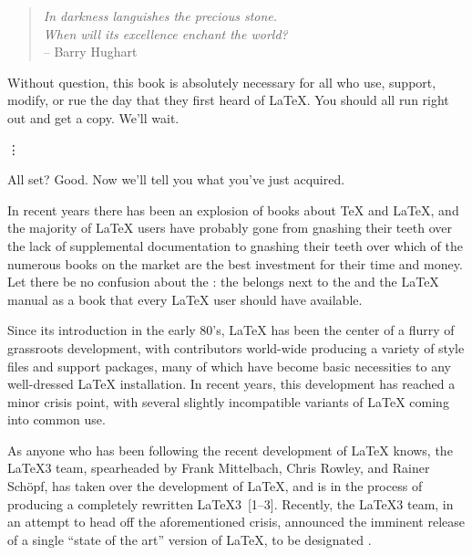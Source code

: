 \maketitle

\begin{verse}
{\em In darkness languishes the precious stone.\\
When will its excellence enchant the world?}\\
\hfill -- Barry Hughart
\end{verse}

\medskip

\reviewitem
{}
\endreviewitem

Without question, this book is absolutely necessary for all who use,
support, modify, or rue the day that they first heard of
\LaTeX.  You should all run right out and get a copy.  We'll wait.

\centerline{\vdots}

\noindent
All set?  Good.  Now we'll tell you what you've just acquired.

\bigskip

\noindent
In recent years there has been an explosion of books about \TeX{} and
\LaTeX, and the majority of \LaTeX{} users have probably gone from
gnashing their teeth over the lack of supplemental documentation to
gnashing their teeth over which of the numerous books on the market
are the best investment for their time and money.  Let there be no
confusion about the : the
 belongs next to the  and the
\LaTeX{} manual as a book that every \LaTeX{} user should have
available.

Since its introduction in the early 80's, \LaTeX{} has been the center
of a flurry of grassroots development, with contributors world-wide
producing a variety of style files and support packages, many of which
have become basic necessities to any well-dressed \LaTeX{}
installation.  In recent years, this development has reached a minor
crisis point, with several slightly incompatible variants of \LaTeX{}
coming into common use.

As anyone who has been following the recent development of \LaTeX{}
knows, the \LaTeX3 team, spearheaded by Frank Mittelbach, Chris
Rowley, and Rainer Sch\"opf, has taken over the development of \LaTeX,
and is in the process of producing a completely rewritten
\LaTeX3~[1--3].
Recently, the \LaTeX3 team, in an attempt to head off the
aforementioned crisis, announced the imminent release of a single
``state of the art'' version of \LaTeX, to be designated \LaTeXe.

